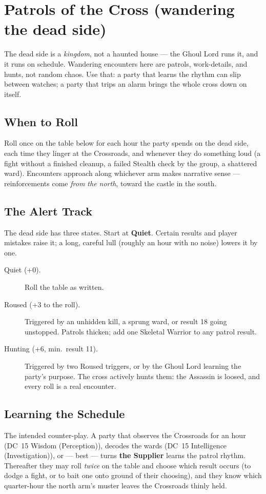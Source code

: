 \documentclass[10pt,twoside]{report}
\newcommand{\dc}[1]{DC~#1}
\begin{document}
\section{Patrols of the Cross (wandering the dead side)}
The dead side is a \emph{kingdom}, not a haunted house --- the Ghoul Lord runs it, and it runs on schedule. Wandering encounters here are patrols, work-details, and hunts, not random chaos. Use that: a party that learns the rhythm can slip between watches; a party that trips an alarm brings the whole cross down on itself.

\subsection*{When to Roll}
Roll once on the table below for each hour the party spends on the dead side, each time they linger at the Crossroads, and whenever they do something loud (a fight without a finished cleanup, a failed Stealth check by the group, a shattered ward). Encounters approach along whichever arm makes narrative sense --- reinforcements come \emph{from the north}, toward the castle in the south.

\subsection*{The Alert Track}
The dead side has three states. Start at \textbf{Quiet}. Certain results and player mistakes raise it; a long, careful lull (roughly an hour with no noise) lowers it by one.
\begin{description}
\item[Quiet (+0).] Roll the table as written.
\item[Roused (+3 to the roll).] Triggered by an unhidden kill, a sprung ward, or result 18 going unstopped. Patrols thicken; add one Skeletal Warrior to any patrol result.
\item[Hunting (+6, min.\ result 11).] Triggered by two Roused triggers, or by the Ghoul Lord learning the party's purpose. The cross actively hunts them: the Assassin is loosed, and every roll is a real encounter.
\end{description}

\subsection*{Learning the Schedule}
The intended counter-play. A party that observes the Crossroads for an hour (\dc{15} Wisdom (Perception)), decodes the wards (\dc{15} Intelligence (Investigation)), or --- best --- turns \textbf{the Supplier} learns the patrol rhythm. Thereafter they may roll \emph{twice} on the table and choose which result occurs (to dodge a fight, or to bait one onto ground of their choosing), and they know which quarter-hour the north arm's muster leaves the Crossroads thinly held.
\end{document}
